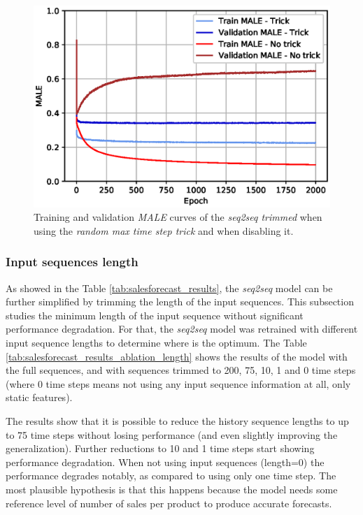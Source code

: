 \begin{figure}[h!]
	\centering
	\includegraphics[width=0.7\linewidth]{salesforecast/images/train_curves_notrick}
	\caption[Training and validation sales \textit{MALE} curves]{Training and validation \textit{MALE} curves of the \textit{seq2seq trimmed} when using the \textit{random max time step trick} and when disabling it.}
	\label{fig:traincurvesnotrick}
\end{figure}

\subsubsection{Input sequences length}
As showed in the Table \ref{tab:salesforecast_results}, the \textit{seq2seq} model can be further simplified by trimming the length of the input sequences. This subsection studies the minimum length of the input sequence without significant performance degradation. For that, the \textit{seq2seq} model was retrained with different input sequence lengths to determine where is the optimum. The Table 		\ref{tab:salesforecast_results_ablation_length} shows the results of the model with the full sequences, and with sequences trimmed to 200, 75, 10, 1 and 0 time steps (where 0 time steps means not using any input sequence information at all, only static features). 

The results show that it is possible to reduce the history sequence lengths to up to 75 time steps without losing performance (and even slightly improving the generalization). Further reductions to 10 and 1 time steps start showing performance degradation. When not using input sequences (length=0) the performance degrades notably, as compared to using only one time step. The most plausible hypothesis is that this happens because the model needs some reference level of number of sales per product to produce accurate forecasts.

